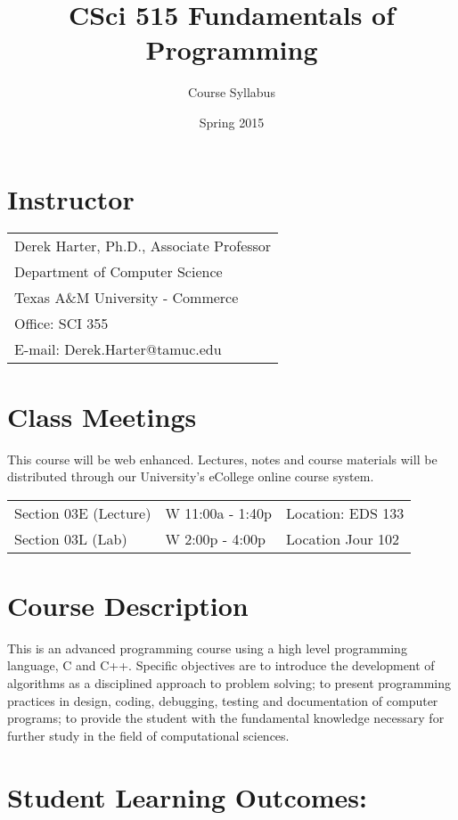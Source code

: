 \documentclass[11pt]{article}
\author{Course Syllabus}
\date{Spring 2015}
\title{CSci 515 Fundamentals of Programming}
\begin{document}
\maketitle

\section*{Instructor}
\label{sec-1}

\begin{center}
\begin{tabular}{l}
Derek Harter, Ph.D., Associate Professor\\
Department of Computer Science\\
Texas A\&M University - Commerce\\
Office: SCI 355\\
E-mail: Derek.Harter@tamuc.edu\\
\end{tabular}
\end{center}
\section*{Class Meetings}
\label{sec-2}

This course will be web enhanced.  Lectures, notes and course
materials will be distributed through our University's eCollege online
course system.

\begin{center}
\begin{tabular}{lll}
Section 03E (Lecture) & W 11:00a - 1:40p & Location: EDS 133\\
Section 03L (Lab) & W  2:00p - 4:00p & Location Jour 102\\
\end{tabular}
\end{center}
\section*{Course Description}
\label{sec-3}
This is an advanced programming course using a high level programming
language, C and C++. Specific objectives are to introduce the
development of algorithms as a disciplined approach to problem
solving; to present programming practices in design, coding,
debugging, testing and documentation of computer programs; to provide
the student with the fundamental knowledge necessary for further study
in the field of computational sciences.
\section*{Student Learning Outcomes:}
\label{sec-4}
\end{document}

